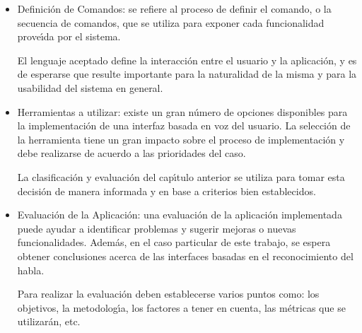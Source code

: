 \begin{itemize}
    \item Definici\'on de Comandos: se refiere al proceso de definir el comando, o la secuencia de
    comandos, que se utiliza para exponer cada funcionalidad prove{\'\i}da por el sistema.

    El lenguaje aceptado define la interacci\'on entre el usuario y la aplicaci\'on, y es de esperarse
    que resulte importante para la naturalidad de la misma y para la usabilidad del sistema en
    general.

    \item Herramientas a utilizar: existe un gran n\'umero de opciones disponibles
    para la implementaci\'on de una interfaz basada en voz del usuario.
    La selecci\'on de la herramienta tiene un gran impacto sobre el proceso de implementaci\'on
    y debe realizarse de acuerdo a las prioridades del caso.

    La clasificaci\'on y evaluaci\'on del cap{\'\i}tulo anterior se utiliza 
    para tomar esta decisi\'on de manera informada y en base a criterios bien establecidos.

    \item Evaluaci\'on de la Aplicaci\'on: una evaluaci\'on de la aplicaci\'on implementada puede ayudar
    a identificar problemas y sugerir mejoras o nuevas funcionalidades. Adem\'as, en el caso particular
    de este trabajo, se espera obtener conclusiones acerca de las interfaces basadas en el reconocimiento
    del habla.

    Para realizar la evaluaci\'on deben establecerse varios puntos como: los objetivos, la metodolog{\'\i}a,
    los factores a tener en cuenta, las m\'etricas que se utilizar\'an, etc.

 \end{itemize} 